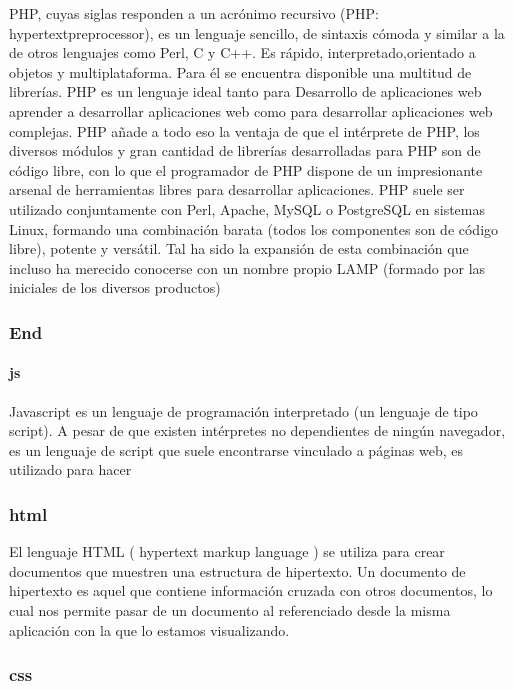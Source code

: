 \documentclass[11pt]{article}
\begin{document}
PHP, cuyas siglas responden a un acrónimo recursivo (PHP:
hypertextpreprocessor), es un lenguaje sencillo, de sintaxis cómoda y
similar a la de otros lenguajes como Perl, C y C++. Es rápido,
interpretado,orientado a objetos y multiplataforma. Para él se encuentra
disponible una multitud de librerías. PHP es un lenguaje ideal tanto
para Desarrollo de aplicaciones web aprender a desarrollar aplicaciones
web como para desarrollar aplicaciones web complejas. PHP añade a todo
eso la ventaja de que el intérprete de PHP, los diversos módulos y gran
cantidad de librerías desarrolladas para PHP son de código libre, con lo
que el programador de PHP dispone de un impresionante arsenal de
herramientas libres para desarrollar aplicaciones. PHP suele ser
utilizado conjuntamente con Perl, Apache, MySQL o PostgreSQL en sistemas
Linux, formando una combinación barata (todos los componentes son de
código libre), potente y versátil. Tal ha sido la expansión de esta
combinación que incluso ha merecido conocerse con un nombre propio LAMP
(formado por las iniciales de los diversos productos)

\hypertarget{end}{%
\subsubsection{End}\label{end}}

\hypertarget{js}{%
\paragraph{js}\label{js}}

Javascript es un lenguaje de programación interpretado (un lenguaje de
tipo script). A pesar de que existen intérpretes no dependientes de
ningún navegador, es un lenguaje de script que suele encontrarse
vinculado a páginas web, es utilizado para hacer

\hypertarget{html}{%
\subsubsection{html}\label{html}}

El lenguaje HTML ( hypertext markup language ) se utiliza para crear
documentos que muestren una estructura de hipertexto. Un documento de
hipertexto es aquel que contiene información cruzada con otros
documentos, lo cual nos permite pasar de un documento al referenciado
desde la misma aplicación con la que lo estamos visualizando.

\hypertarget{css}{%
\subsubsection{css}\label{css}}
\end{document}
